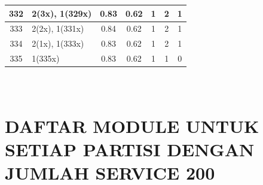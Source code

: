 \begin{small}
\begin{longtable}{|c|p{4cm}|c|c|c|c|c|}
  332 & 2(3x), 1(329x) & \cellcolor{colorBad}  0.83 & \cellcolor{colorBad} 0.62 & 1 & 2 & \cellcolor{colorGood} 1 \\   \hline
  333 & 2(2x), 1(331x) & \cellcolor{colorBad}  0.84 & \cellcolor{colorBad} 0.62 & 1 & 2 & \cellcolor{colorGood} 1 \\   \hline
  334 & 2(1x), 1(333x) & \cellcolor{colorBad}  0.83 & \cellcolor{colorBad} 0.62 & 1 & 2 & \cellcolor{colorGood} 1 \\   \hline
  335 & 1(335x) & \cellcolor{colorBad}  0.83 & \cellcolor{colorBad} 0.62 & 1 & 1 & \cellcolor{colorGood} 0 \\   \hline  
\end{longtable}
\end{small}
\endgroup


\chapter{\\ DAFTAR MODULE UNTUK SETIAP PARTISI DENGAN JUMLAH SERVICE 200}

